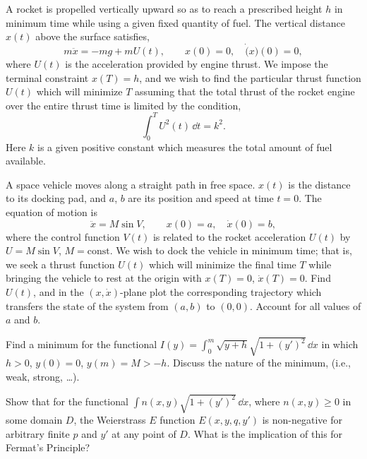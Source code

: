 \begin{Exercise}
  A rocket is propelled vertically upward so as to reach a prescribed height
  $h$ in minimum time while using a given fixed quantity of fuel.  The
  vertical distance $x(t)$ above the surface satisfies,
  \[
  m \ddot{x} = - m g + m U(t), \qquad
  x(0) = 0, \quad \dot(x)(0) = 0,
  \]
  where $U(t)$ is the acceleration provided by engine thrust.  We impose the
  terminal constraint $x(T) = h$, and we wish to find the particular 
  thrust function $U(t)$ which will minimize $T$ assuming that the
  total thrust of the rocket engine over the entire thrust time is limited
  by the condition,
  \[
  \int_0^{T} U^2(t)\,\dd t = k^2.
  \]
  Here $k$ is a given positive constant which measures the total
  amount of fuel available.
\end{Exercise}



\begin{Exercise}
  A space vehicle moves along a straight path in free space.  $x(t)$ is
  the distance to its docking pad, and $a$, $b$ are its position 
  and speed at time $t = 0$.  The equation of motion is
  \[
  \ddot{x} = M \sin V, \qquad x(0) = a, \quad \dot{x}(0) = b,
  \]
  where the control function $V(t)$ is related to the rocket acceleration
  $U(t)$ by $U = M \sin V$, $M = \mathrm{const}$.  We wish to dock the 
  vehicle in minimum time; that is, we seek a thrust function $U(t)$
  which will minimize the final time $T$ while bringing the vehicle
  to rest at the origin with $x(T) = 0$, $\dot{x}(T) = 0$.  Find
  $U(t)$, and in the $(x,\dot{x})$-plane plot the corresponding
  trajectory which transfers the state of the system from $(a, b)$
  to $(0,0)$.  Account for all values of $a$ and $b$.
\end{Exercise}



\begin{Exercise}
  Find a minimum for the functional 
  $I(y) = \int_0^m \sqrt{y + h} \sqrt{1 + (y')^2 } \,\dd x$
  in which $h>0$, $y(0) = 0$, $y(m) = M > -h$.  Discuss the nature of the 
  minimum, (i.e., weak, strong, \ldots).
\end{Exercise}



\begin{Exercise}
  Show that for the functional $\int n(x,y) \sqrt{1+(y')^2} \,\dd x$,
  where $n(x,y) \geq 0$ in some domain $D$, the Weierstrass $E$ function
  $E(x,y,q,y')$ is non-negative for arbitrary finite $p$ and $y'$ at any 
  point of $D$.  What is the implication of this for Fermat's Principle?
\end{Exercise}



